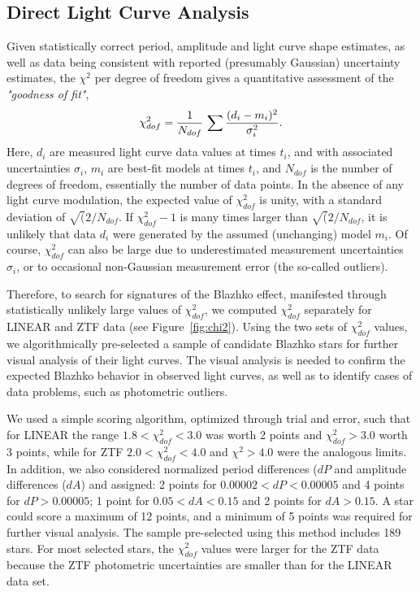  
\subsection{Direct Light Curve Analysis}

Given statistically correct period, amplitude and light curve shape estimates,
as well as data being consistent with reported (presumably Gaussian) uncertainty estimates, the $\chi^2$ per degree
of freedom gives a quantitative assessment of the \textit{"goodness of fit"},
\begin{equation}
        \chi_{dof}^2 = {1 \over N_{dof}} \, \sum{\frac{(d_i - m_i)^2}{\sigma_i^2}}.
\end{equation}
Here, $d_i$ are measured light curve data values at times $t_i$, and with associated uncertainties $\sigma_i$,
$m_i$ are best-fit models at times $t_i$, and $N_{dof}$ is the number of degrees of freedom, essentially the
number of data points. In the absence of any light curve modulation, the expected value of $\chi^2_{dof}$ is
unity, with a standard deviation of $\sqrt(2/N_{dof}$.  If $\chi^2_{dof} - 1$ is many times  larger than 
$\sqrt(2/N_{dof}$, it is unlikely that data $d_i$ were generated by the assumed (unchanging) model $m_i$.  
Of course, $\chi^2_{dof}$ can also be large due to underestimated measurement uncertainties $\sigma_i$,
or to occasional non-Gaussian measurement error (the so-called outliers). 

Therefore, to search for signatures of the Blazhko effect, manifested through statistically unlikely large values
of $\chi^2_{dof}$, we computed $\chi^2_{dof}$ separately for LINEAR and ZTF data (see Figure~\ref{fig:chi2}). 
Using the two sets of $\chi^2_{dof}$ values, we algorithmically pre-selected a sample of candidate Blazhko stars
for further visual analysis of their light curves. The visual analysis is needed to confirm the expected Blazhko behavior
in observed light curves, as well as to identify cases of data problems, such as photometric outliers. 

We used a simple scoring algorithm, optimized through trial and error,
such that for LINEAR the range $1.8<\chi^2_{dof}<3.0$ was worth 2 points and $\chi^2_{dof}>3.0$ worth 3 points,
while for ZTF $2.0<\chi^2_{dof}<4.0$ and $\chi^2>4.0$ were the analogous limits. In addition, we also considered
normalized period differences ($dP$ and amplitude differences ($dA$) and assigned: 2 points for $0.00002 < dP < 0.00005$
and 4 points for $dP > 0.00005$; 1 point for $0.05 < dA < 0.15$ and 2 points for $dA > 0.15$. 
A star could score a maximum of 12 points, and a minimum of 5 points was required for further visual analysis. 
The sample pre-selected using this method includes 189 stars. For most selected stars, the $\chi^2_{dof}$ values were
larger for the ZTF data because the ZTF photometric uncertainties are smaller than for the LINEAR data set. 
  

